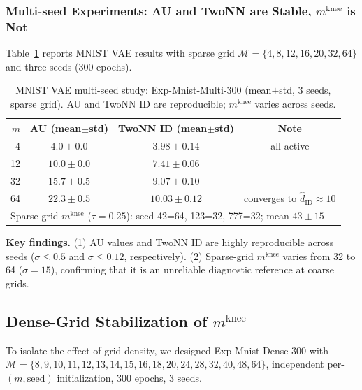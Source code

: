 \documentclass[make,article,submit,pdftex,moreauthors]{Definitions/mdpi}
\newcommand{\mknee}{m^{\mathrm{knee}}}
\newcommand{\hatdID}{\hat{d}_{\mathrm{ID}}}
\begin{document}
\subsubsection{Multi-seed Experiments: AU and TwoNN are Stable, $\mknee$ is Not}
\label{sec:exp_multiseed}

Table~\ref{tab:multiseed_300} reports MNIST VAE results with sparse grid
$\mathcal{M}=\{4,8,12,16,20,32,64\}$ and three seeds (300 epochs).

\begin{table}[ht]
\centering
\caption{MNIST VAE multi-seed study: Exp-Mnist-Multi-300 (mean$\pm$std, 3 seeds, sparse grid).
AU and TwoNN ID are reproducible; $\mknee$ varies across seeds.}
\label{tab:multiseed_300}
\small
\begin{tabular}{rccc}
\toprule
$m$ & AU (mean$\pm$std) & TwoNN ID (mean$\pm$std) & Note \\
\midrule
4  & $4.0\pm0.0$ & $3.98\pm0.14$ & all active \\
12 & $10.0\pm0.0$ & $7.41\pm0.06$ & \\
32 & $15.7\pm0.5$ & $9.07\pm0.10$ & \\
64 & $22.3\pm0.5$ & $\mathbf{10.03\pm0.12}$ & converges to $\hatdID\approx10$ \\
\midrule
\multicolumn{4}{l}{Sparse-grid $\mknee$ ($\tau=0.25$):
seed 42=64, 123=32, 777=32; mean $43\pm15$} \\
\bottomrule
\end{tabular}
\end{table}

\textbf{Key findings.}
(1) AU values and TwoNN ID are highly reproducible across seeds
($\sigma\leq0.5$ and $\sigma\leq0.12$, respectively).
(2) Sparse-grid $\mknee$ varies from 32 to 64 ($\sigma=15$), confirming that
it is an unreliable diagnostic reference at coarse grids.

\subsection{\texorpdfstring{Dense-Grid Stabilization of $\mknee$}{Dense-Grid Stabilization of m\_knee}}\label{sec:exp_dense}

To isolate the effect of grid density, we designed
Exp-Mnist-Dense-300 with
$\mathcal{M}=\{8,9,10,11,12,13,14,15,16,18,20,24,28,32,40,48,64\}$,
independent per-$(m,\text{seed})$ initialization, 300 epochs, 3 seeds.
\end{document}
